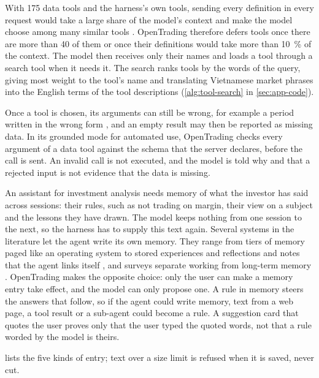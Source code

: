 \label{sec:tool-search}
With \num{175} data tools and the harness's own tools, sending every definition in every request would take a large share of the model's context and make the model choose among many similar tools \parencite{qin2024toolllm}.
OpenTrading therefore defers tools once there are more than 40 of them or once their definitions would take more than \qty{10}{\percent} of the context.
The model then receives only their names and loads a tool through a search tool when it needs it.
The search ranks tools by the words of the query, giving most weight to the tool's name and translating Vietnamese market phrases into the English terms of the tool descriptions (\cref{alg:tool-search} in \cref{sec:app-code}).

Once a tool is chosen, its arguments can still be wrong, for example a period written in the wrong form \parencite{yao2024taubench}, and an empty result may then be reported as missing data.
In its grounded mode for automated use, OpenTrading checks every argument of a data tool against the schema that the server declares, before the call is sent.
An invalid call is not executed, and the model is told why and that a rejected input is not evidence that the data is missing.

\label{sec:memory}
An assistant for investment analysis needs memory of what the investor has said across sessions: their rules, such as not trading on margin, their view on a subject and the lessons they have drawn.
The model keeps nothing from one session to the next, so the harness has to supply this text again.
Several systems in the literature let the agent write its own memory.
They range from tiers of memory paged like an operating system \parencite{packer2023memgpt} to stored experiences and reflections \parencite{park2023generative,shinn2023reflexion} and notes that the agent links itself \parencite{xu2025amem}, and surveys separate working from long-term memory \parencite{sumers2024cognitive,zhang2025survey}.
OpenTrading makes the opposite choice: only the user can make a memory entry take effect, and the model can only propose one.
A rule in memory steers the answers that follow, so if the agent could write memory, text from a web page, a tool result or a sub-agent could become a rule.
A suggestion card that quotes the user proves only that the user typed the quoted words, not that a rule worded by the model is theirs.

 lists the five kinds of entry; text over a size limit is refused when it is saved, never cut.

